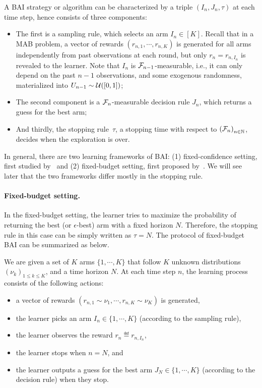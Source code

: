 A BAI strategy or algorithm can be characterized by a triple $(I_n, J_n, \tau)$ at each time step, hence consists of three components: 
\begin{itemize}
    \item The first is a \gls{sampling rule}, which selects an arm $I_n\in[K]$. Recall that in a MAB problem, a vector of rewards $(r_{n,1},\cdots,r_{n,K})$ is generated for all arms independently from past observations at each round, but only $r_n = r_{n,I_n}$ is revealed to the learner. Note that $I_n$ is $\mathcal{F}_{n-1}$-measurable, i.e., it can only depend on the past $n-1$ observations, and some exogenous randomness, materialized into $U_{n-1} \sim \mathcal{U}([0,1])$;
    \item The second component is a $\mathcal{F}_{n}$-measurable \gls{decision rule} $J_n$, which returns a guess for the best arm;
    \item And thirdly, the \gls{stopping rule}~$\tau$, a stopping time with respect to $\left(\mathcal{F}_{n}\right)_{n \in \mathbb{N}}$, decides when the exploration is over.
\end{itemize}

In general, there are two learning frameworks of BAI: (1) \gls{fixed-confidence setting}, first studied by~\citep{even-dar2003confidence} and (2) \gls{fixed-budget setting}, first proposed by~\citep{audibert2010budget}. We will see later that the two frameworks differ mostly in the stopping rule.

\paragraph{Fixed-budget setting.}

In the fixed-budget setting, the learner tries to maximize the probability of returning the best (or $\epsilon$-best) arm with a fixed horizon $N$. Therefore, the stopping rule in this case can be simply written as $\tau=N$. The protocol of fixed-budget BAI can be summarized as below.

\begin{definition}\label{def:mab.bai_budget}
\begin{leftbar}[defnbar]
	We are given a set of $K$ arms $\{1,\cdots,K\}$ that follow $K$ unknown distributions $(\nu_k)_{1 \leq k \leq K}$, and a time horizon $N$. At each time step $n$, the learning process consists of the following actions:
\begin{itemize}
	\item a vector of rewards $(r_{n,1} \sim \nu_1, \cdots, r_{n,K} \sim \nu_K)$ is generated,
	\item the learner picks an arm $I_n \in \{1,\cdots,K\}$ (according to the sampling rule),
	\item the learner observes the reward $r_n \eqdef r_{n,I_n}$,
	\item the learner stops when $n=N$, and
	\item the learner outputs a guess for the best arm $J_N \in \{1,\cdots,K\}$ (according to the decision rule) when they stop.
\end{itemize}
\end{leftbar}
\end{definition}

